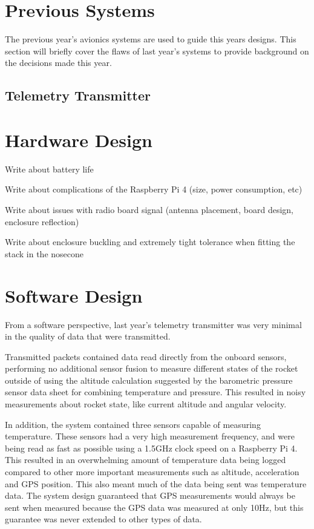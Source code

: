 \section{Previous Systems}

The previous year's avionics systems are used to guide this years designs. This section will briefly cover the flaws of
last year's systems to provide background on the decisions made this year.

\subsection{Telemetry Transmitter}

\section{Hardware Design}

Write about battery life

Write about complications of the Raspberry Pi 4 (size, power consumption, etc)

Write about issues with radio board signal (antenna placement, board design, enclosure reflection)

Write about enclosure buckling and extremely tight tolerance when fitting the stack in the nosecone

\section{Software Design}

From a software perspective, last year's telemetry transmitter was very minimal in the quality of data that were
transmitted.

Transmitted packets contained data read directly from the onboard sensors, performing no additional sensor fusion to
measure different states of the rocket outside of using the altitude calculation suggested by the barometric pressure
sensor data sheet for combining temperature and pressure. This resulted in noisy measurements about rocket state, like
current altitude and angular velocity.

In addition, the system contained three sensors capable of measuring temperature. These sensors had a very high
measurement frequency, and were being read as fast as possible using a 1.5GHz clock speed on a Raspberry Pi 4. This
resulted in an overwhelming amount of temperature data being logged compared to other more important measurements such
as altitude, acceleration and GPS position. This also meant much of the data being sent was temperature data. The system
design guaranteed that GPS measurements would always be sent when measured because the GPS data was measured at only
10Hz, but this guarantee was never extended to other types of data.

